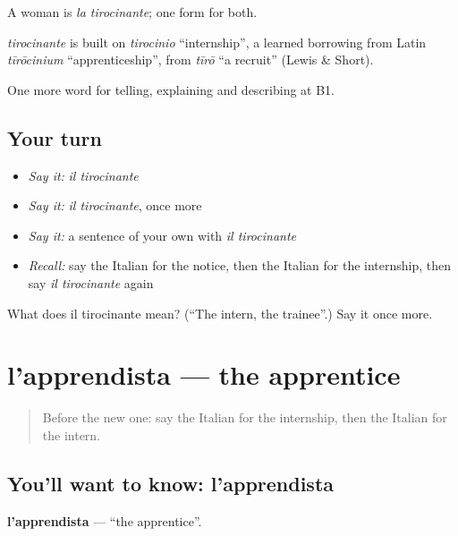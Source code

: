 A woman is \emph{la tirocinante}; one form for both.

\begin{cousinweb}
\emph{tirocinante} is built on \emph{tirocinio} \textquotedblleft{}internship\textquotedblright{}, a learned borrowing from Latin \emph{tīrōcinium} \textquotedblleft{}apprenticeship\textquotedblright{}, from \emph{tīrō} \textquotedblleft{}a recruit\textquotedblright{} (Lewis \& Short).
\end{cousinweb}

\begin{grammarlens}[title={What you've built}]
One more word for telling, explaining and describing at B1.
\end{grammarlens}

\subsection*{Your turn}
\begin{itemize}
\raggedright
  \item \emph{Say it:} \emph{il tirocinante}
  \item \emph{Say it:} \emph{il tirocinante}, once more
  \item \emph{Say it:} a sentence of your own with \emph{il tirocinante}
  \item \emph{Recall:} say the Italian for the notice, then the Italian for the internship, then say \emph{il tirocinante} again
\end{itemize}

\begin{tcolorbox}[breakable,colback=teal!4,colframe=teal!35!black,title={Before you move on}]
What does il tirocinante mean? (\textquotedblleft{}The intern, the trainee\textquotedblright{}.) Say it once more.
\end{tcolorbox}
\section[l'apprendista]{l'apprendista — the apprentice}

\label{lesson:IT-C358-apprendista}



\begin{quote}
Before the new one: say the Italian for the internship, then the Italian for the intern.
\end{quote}

\subsection*{You'll want to know: l'apprendista}
\textbf{l'apprendista} — \textquotedblleft{}the apprentice\textquotedblright{}.

